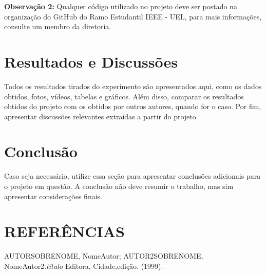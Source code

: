 \documentclass[a4paper,12pt]{article}
\begin{document}
\textbf{Observação 2: }Qualquer código utilizado no projeto deve ser postado na organização do GitHub do Ramo Estudantil IEEE - UEL, para mais informações, consulte um membro da diretoria.

\newpage
\section{Resultados e Discussões}
\label{sec:resultados}
Todos  os  resultados  tirados  do  experimento  são  apresentados  aqui,  como os dados obtidos, fotos, vídeos, tabelas e gráficos. Além disso, comparar os resultados obtidos do projeto com os obtidos por outros autores, quando for o caso. Por fim, apresentar discussões relevantes extraídas a partir do projeto.

\newpage
\section{Conclusão}
\label{sec:conclusao}
Caso seja necessário, utilize essa seção para apresentar conclusões adicionais para o projeto em questão. A conclusão não deve resumir o trabalho, mas sim apresentar considerações finais. 

\newpage
\section{REFERÊNCIAS}
\begingroup
\renewcommand{\section}[2]{}

\begin{thebibliography}{3} %

 AUTORSOBRENOME, NomeAutor; AUTOR2SOBRENOME, NomeAutor2.\textit{título} Editora, Cidade,edição. (1999).

\end{thebibliography}
\end{document}
